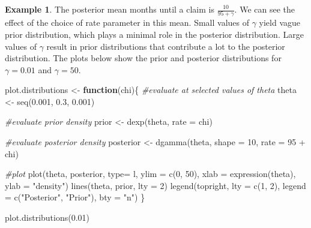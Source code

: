 \documentclass[
]{book}
\newenvironment{Shaded}{\begin{snugshade}}{\end{snugshade}}
\newcommand{\AttributeTok}[1]{\textcolor[rgb]{0.77,0.63,0.00}{#1}}
\newcommand{\CommentTok}[1]{\textcolor[rgb]{0.56,0.35,0.01}{\textit{#1}}}
\newcommand{\ControlFlowTok}[1]{\textcolor[rgb]{0.13,0.29,0.53}{\textbf{#1}}}
\newcommand{\DecValTok}[1]{\textcolor[rgb]{0.00,0.00,0.81}{#1}}
\newcommand{\FloatTok}[1]{\textcolor[rgb]{0.00,0.00,0.81}{#1}}
\newcommand{\FunctionTok}[1]{\textcolor[rgb]{0.00,0.00,0.00}{#1}}
\newcommand{\NormalTok}[1]{#1}
\newcommand{\OtherTok}[1]{\textcolor[rgb]{0.56,0.35,0.01}{#1}}
\newcommand{\SpecialCharTok}[1]{\textcolor[rgb]{0.00,0.00,0.00}{#1}}
\newcommand{\StringTok}[1]{\textcolor[rgb]{0.31,0.60,0.02}{#1}}
\theoremstyle{definition}
\theoremstyle{definition}
\newtheorem{example}{Example}[chapter]
\theoremstyle{definition}
\theoremstyle{definition}
\theoremstyle{remark}
\begin{document}
\begin{example}
The posterior mean months until a claim is \(\frac{10}{95 + \gamma}\). We can see the effect of the choice of rate parameter in this mean. Small values of \(\gamma\) yield vague prior distribution, which plays a minimal role in the posterior distribution. Large values of \(\gamma\) result in prior distributions that contribute a lot to the posterior distribution. The plots below show the prior and posterior distributions for \(\gamma = 0.01\) and \(\gamma = 50\).

\begin{Shaded}
\begin{Highlighting}[]
\NormalTok{plot.distributions }\OtherTok{\textless{}{-}} \ControlFlowTok{function}\NormalTok{(chi)\{}
  \CommentTok{\#evaluate at selected values of theta}
\NormalTok{  theta }\OtherTok{\textless{}{-}} \FunctionTok{seq}\NormalTok{(}\FloatTok{0.001}\NormalTok{, }\FloatTok{0.3}\NormalTok{, }\FloatTok{0.001}\NormalTok{) }
  
  \CommentTok{\#evaluate prior density}
\NormalTok{  prior }\OtherTok{\textless{}{-}} \FunctionTok{dexp}\NormalTok{(theta, }\AttributeTok{rate =}\NormalTok{ chi)}
  
  \CommentTok{\#evaluate posterior density}
\NormalTok{  posterior }\OtherTok{\textless{}{-}} \FunctionTok{dgamma}\NormalTok{(theta, }\AttributeTok{shape =} \DecValTok{10}\NormalTok{, }\AttributeTok{rate =} \DecValTok{95} \SpecialCharTok{+}\NormalTok{ chi)}
  
  
  \CommentTok{\#plot}
  \FunctionTok{plot}\NormalTok{(theta, posterior, }\AttributeTok{type=} \StringTok{\textquotesingle{}l\textquotesingle{}}\NormalTok{, }
       \AttributeTok{ylim =} \FunctionTok{c}\NormalTok{(}\DecValTok{0}\NormalTok{, }\DecValTok{50}\NormalTok{), }\AttributeTok{xlab =} \FunctionTok{expression}\NormalTok{(theta), }\AttributeTok{ylab =} \StringTok{"density"}\NormalTok{)}
  \FunctionTok{lines}\NormalTok{(theta, prior, }\AttributeTok{lty =} \DecValTok{2}\NormalTok{)}
  \FunctionTok{legend}\NormalTok{(}\StringTok{\textquotesingle{}topright\textquotesingle{}}\NormalTok{, }\AttributeTok{lty =} \FunctionTok{c}\NormalTok{(}\DecValTok{1}\NormalTok{, }\DecValTok{2}\NormalTok{), }\AttributeTok{legend =} \FunctionTok{c}\NormalTok{(}\StringTok{"Posterior"}\NormalTok{, }\StringTok{"Prior"}\NormalTok{),  }
         \AttributeTok{bty =} \StringTok{"n"}\NormalTok{)}
\NormalTok{\}}

\FunctionTok{plot.distributions}\NormalTok{(}\FloatTok{0.01}\NormalTok{)}
\end{Highlighting}
\end{Shaded}


\end{example}
\end{document}
